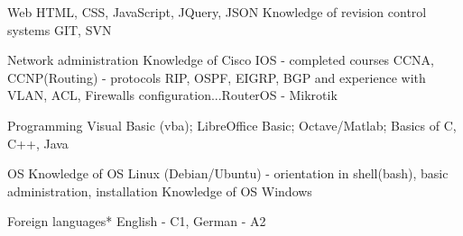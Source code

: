 \begin{cvskills}

  \vspace{5pt}
  \cvskill
    {Web} %
    {HTML, CSS, JavaScript, JQuery, JSON \newline Knowledge of revision control systems GIT, SVN}

  \vspace{5pt}
    
  \cvskill
    {Network administration} %
    {Knowledge of Cisco IOS - completed courses CCNA, CCNP(Routing) - protocols RIP, OSPF, EIGRP, BGP and \newline experience with VLAN, ACL, Firewalls configuration...\newline RouterOS - Mikrotik} %
  \vspace{5pt}
  
  \cvskill
    {Programming} %
    {Visual Basic (vba); LibreOffice Basic; Octave/Matlab; Basics of C, C++, Java} %

  \vspace{5pt}
  \cvskill
    {OS}
    {Knowledge of OS Linux (Debian/Ubuntu) - orientation in shell(bash), basic administration, installation \newline Knowledge of OS Windows}
  \vspace{5pt}
    
  \cvskill
    {Foreign languages*} %
    {English - C1, German - A2} %

\end{cvskills}